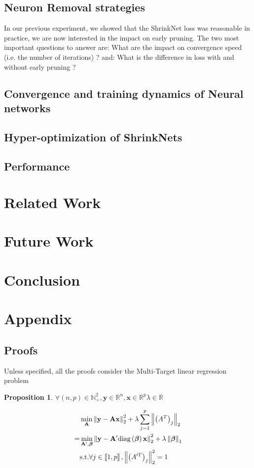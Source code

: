 \documentclass{article}
\newcommand{\norm}[1]{\left\lVert#1\right\rVert}
\newcommand{\diag}[1]{\text{diag}\left(#1\right)}
\newcommand{\intint}[1]{\left\llbracket#1\right\rrbracket}
\newtheorem{proposition}{Proposition}[section]
\begin{document}
\subsection{Neuron Removal strategies}

In our previous experiment, we showed that the ShrinkNet loss was
reasonable in practice, we are now interested in the impact on
early pruning. The two most important questions to answer are:
What are the impact on convergence speed (i.e. the number of iterations) ?
and: What is the difference in loss with and without early pruning ?

\subsection{Convergence and training dynamics of Neural networks}

\subsection{Hyper-optimization of ShrinkNets}

\subsection{Performance}

\section{Related Work}

\section{Future Work}

\section{Conclusion}

\appendix
\section{Appendix}
\subsection{Proofs}
Unless specified, all the proofs consider the Multi-Target linear regression problem
\begin{proposition}
\label{gps_equivalence}
  $\forall (n, p) \in \mathbb{N}_+^2, \bm{y} \in \mathbb{R}^{n}, \bm{x} \in \mathbb{R}^{p} \lambda \in \mathbb{R}$
  
  \begin{align*}
    & \min_{\bf{A}} \norm{\bf{y} - \bf{A}\bf{x}}_2^2 + \lambda \sum_{j=1}^p \norm{\left(A^T\right)_j}_2 \\
     = &\min_{\bf{A'}, \bm{\beta}} \norm{\bf{y} - \bf{A'}\diag{\bm{\beta}}\bf{x}}_2^2 + \lambda \norm{\bm{\beta}}_1 \\
     & \text{s.t.} \forall j \in \intint{1, p}, \norm{\left(A'^T\right)_j}_2^2 = 1
  \end{align*}
\end{proposition}
\end{document}
